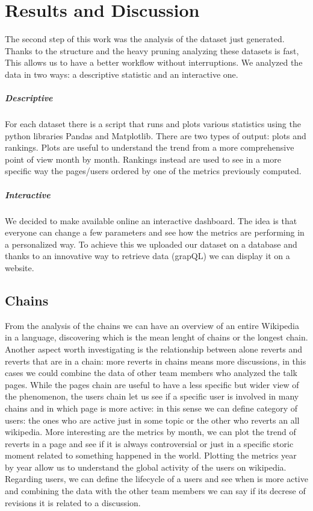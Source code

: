 \chapter{Results and Discussion}

The second step of this work was the analysis of the dataset just generated. Thanks to the structure
and the heavy pruning analyzing these datasets is fast, This allows us to have a better workflow
without interruptions. We analyzed the data in two ways: a descriptive statistic and an interactive
one.
\paragraph*{Descriptive}
For each dataset there is a script that runs and plots various statistics using the python libraries
Pandas and Matplotlib. There are two types of output: plots and rankings. 
Plots are useful to understand the trend from a more comprehensive point of view month by month.  
Rankings instead are used to see in a more specific way the pages/users ordered by one of the
metrics previously computed. 
\paragraph*{Interactive}
We decided to make available online an interactive dashboard. The idea is
that everyone can change a few parameters and see how the metrics are performing in a personalized
way. To achieve this we uploaded our dataset on a database and thanks to an innovative way to retrieve
data (grapQL) we can display it on a website. 

\section{Chains}
From the analysis of the chains we can have an overview of an entire Wikipedia in a language,
discovering which is the mean lenght of chains or the longest chain. Another aspect worth
investigating is the relationship between alone reverts and reverts that are in a chain: more
reverts in chains means more discussions, in this cases we could combine the data of other team
members who analyzed the talk pages. While the pages chain are useful to have a less specific but
wider view of the phenomenon, the users chain let us see if a specific user is involved in many
chains and in which page is more active: in this sense we can define category of users: the ones who
are active just in some topic or the other who reverts an all wikipedia. More interesting are the
metrics by month, we can plot the trend of reverts in a page and see if it is always controversial
or just in a specific storic moment related to something happened in the world. Plotting the metrics
year by year allow us to understand the global activity of the users on wikipedia. Regarding users,
we can define the lifecycle of a users and see when is more active and combining the data with the
other team members we can say if its decrese of revisions  it is related to a discussion.

